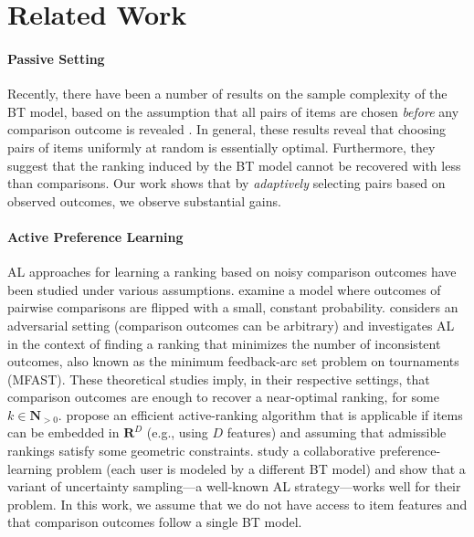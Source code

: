 \section{Related Work}  %
\label{rs:sec:relwork}

\paragraph{Passive Setting}
Recently, there have been a number of results on the sample complexity of the BT model, based on the assumption that all pairs of items are chosen \emph{before} any comparison outcome is revealed
\citep{negahban2012iterative, hajek2014minimax, rajkumar2014statistical, vojnovic2016parameter}.
In general, these results reveal that choosing pairs of items uniformly at random is essentially optimal.
Furthermore, they suggest that the ranking induced by the BT model cannot be recovered with less than  comparisons.
Our work shows that by \emph{adaptively} selecting pairs based on observed outcomes, we observe substantial gains.

\paragraph{Active Preference Learning}
AL approaches for learning a ranking based on noisy comparison outcomes have been studied under various assumptions.
\citet{braverman2008noisy} examine a model where outcomes of pairwise comparisons are flipped with a small, constant probability.
\citet{ailon2012active} considers an adversarial setting (comparison outcomes can be arbitrary) and investigates AL in the context of finding a ranking that minimizes the number of inconsistent outcomes, also known as the minimum feedback-arc set problem on tournaments (MFAST).
These theoretical studies imply, in their respective settings, that  comparison outcomes are enough to recover a near-optimal ranking, for some $k \in \mathbf{N}_{>0}$.
\citet{jamieson2011active} propose an efficient active-ranking algorithm that is applicable if items can be embedded in $\mathbf{R}^D$ (e.g., using $D$ features) and assuming that admissible rankings satisfy some geometric constraints.
\citet{wang2014active} study a collaborative preference-learning problem (each user is modeled by a different BT model) and show that a variant of uncertainty sampling---a well-known AL strategy---works well for their problem.
In this work, we assume that we do not have access to item features and that comparison outcomes follow a single BT model.


